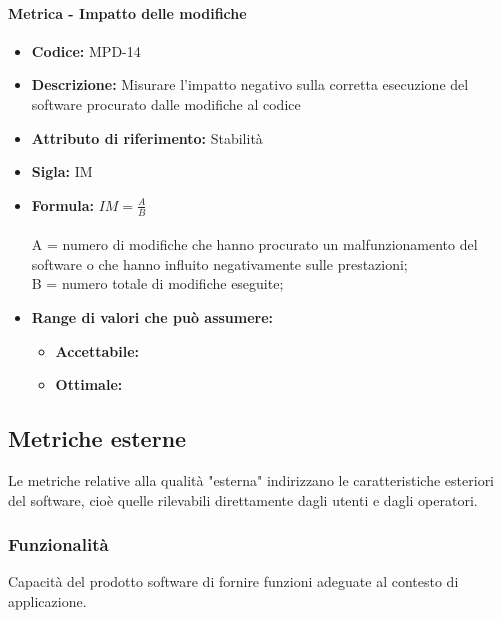            
           \paragraph{Metrica - Impatto delle modifiche} 
              \begin{itemize}
         \item   \textbf{Codice:} MPD-14
          \item  \textbf{Descrizione:} Misurare l'impatto negativo sulla corretta esecuzione del software procurato dalle modifiche al codice
         \item   \textbf{Attributo di riferimento:} Stabilità
         \item   \textbf{Sigla:} IM
         \item   \textbf{Formula:} \begin{math}IM = \frac{A}{B}\end{math}\\ \\
            A = numero di modifiche che hanno procurato un malfunzionamento del software o che hanno influito negativamente sulle prestazioni;\\
            B = numero totale di modifiche eseguite;
               \item \textbf{Range di valori che può assumere:}
        \begin{itemize}
            \item \textbf{Accettabile:} 
            \item \textbf{Ottimale:} 
        \end{itemize}
       \end{itemize}
              
           
\subsection{Metriche esterne}
Le metriche relative alla qualità "esterna" indirizzano le caratteristiche esteriori del software, cioè quelle rilevabili direttamente dagli utenti e dagli operatori.
   \subsubsection{Funzionalità}
   Capacità del prodotto software di fornire funzioni adeguate al contesto di applicazione.
   
